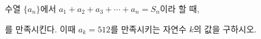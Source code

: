 \hspace*{2mm}\begin{minipage}[t]{\dimexpr\linewidth-2mm\relax}\vspace{0pt}
수열 $\{a_n\}$에서 $a_1+a_2+a_3+\cdots+a_n=S_n$이라 할 때, \par\smallskip{}\par\smallskip\noindent 를 만족시킨다. 이때 $a_k=512$를 만족시키는 자연수 $k$의 값을 구하시오.\end{minipage}
